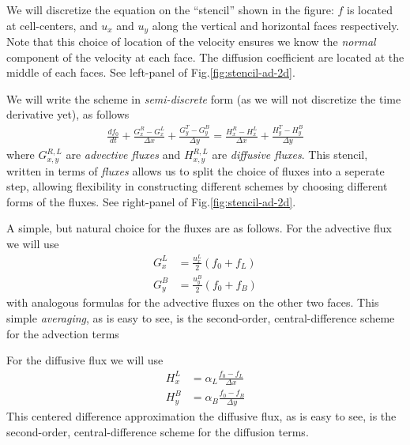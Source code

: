 \documentclass[12pt]{article}
\theoremstyle{definition}
\theoremstyle{definition}
\theoremstyle{definition}
\begin{document}
We will discretize the equation on the ``stencil'' shown in the
figure: $f$ is located at cell-centers, and $u_x$ and $u_y$ along the
vertical and horizontal faces respectively. Note that this choice of
location of the velocity ensures we know the \emph{normal} component
of the velocity at each face. The diffusion coefficient are located at
the middle of each faces. See left-panel of
Fig.\thinspace\ref{fig:stencil-ad-2d}.

We will write the scheme in \emph{semi-discrete} form (as we will not
discretize the time derivative yet), as follows
\begin{align}
  \frac{df_0}{dt}
  +
  \frac{G_x^R -G_x^L}{\Delta x}
  +
  \frac{G_y^T -G_y^B}{\Delta y}
  =
  \frac{H_x^R - H_x^L}{\Delta x}
  +
  \frac{H_y^T - H_y^B}{\Delta y}
\end{align}
where $G^{R,L}_{x,y}$ are \emph{advective fluxes} and $H^{R,L}_{x,y}$
are \emph{diffusive fluxes}. This stencil, written in terms of
\emph{fluxes} allows us to split the choice of fluxes into a seperate
step, allowing flexibility in constructing different schemes by
choosing different forms of the fluxes. See right-panel of
Fig.\thinspace\ref{fig:stencil-ad-2d}.

A simple, but natural choice for the fluxes are as follows. For the
advective flux we will use
\begin{align}
  G_x^L &= \frac{u_x^L}{2} (f_0 + f_L) \\
  G_y^B &= \frac{u_y^B}{2} (f_0 + f_B)
\end{align}
with analogous formulas for the advective fluxes on the other two
faces.  This simple \emph{averaging}, as is easy to see, is the
second-order, central-difference scheme for the advection terms

For the diffusive flux we will use
\begin{align}
  H_x^L &= \alpha_L\frac{f_0 - f_L}{\Delta x} \\
  H_y^B &= \alpha_B \frac{f_0 - f_B}{\Delta y}
\end{align}
This centered difference approximation the diffusive flux, as is easy
to see, is the second-order, central-difference scheme for the
diffusion terms.
\end{document}
